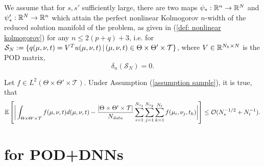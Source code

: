 \begin{assumption} \label{assumption perfect embedding}
    We assume that for $s, s'$ sufficiently large, there are two maps $\psi_*: \mathbb{R}^n \to \mathbb{R}^N$ and $\psi_*': \mathbb{R}^N \to \mathbb{R}^n$ which attain the perfect nonlinear Kolmogorov $n$-width of the reduced solution manifold of the problem, as given in (\ref{def: nonlinear kolmogorov}) for any $n \leq 2(p + q) + 3$, i.e.
    for $\mathcal{S}_N := \{ q(\mu, \nu, t) = V^T u(\mu, \nu, t) \, \vert \, (\mu, \nu, t) \in \Theta \times \Theta' \times \mathcal{T} \}$, where $V \in \mathbb{R}^{N_h \times N}$ is the POD matrix,
    \begin{equation*}
        \delta_n(\mathcal{S}_N) = 0.
    \end{equation*}
\end{assumption}



\begin{proposition} \label{prop: order of convergence for sample}
    Let $f \in L^2(\Theta \times \Theta' \times \mathcal{T})$. Under Assumption (\ref{assumption sample}), it is true, that
    \begin{equation*}
        \mathbb{E}\left[ \bigg\vert \int_{\Theta \times \Theta' \times \mathcal{T}} f(\mu, \nu, t) d(\mu, \nu, t) - \frac{\vert \Theta \times \Theta' \times \mathcal{T} \vert}{N_{data}} \sum_{i = 1}^{N_{s_1}} \sum_{j = 1}^{N_{s_2}} \sum_{k = 1}^{N_t} f(\mu_i, \nu_j, t_k) \bigg\vert \right] \leq \mathcal{O}(N_s^{-1/2} + N_t^{-1}).
    \end{equation*}
\end{proposition}


\section{for POD+DNNs}



